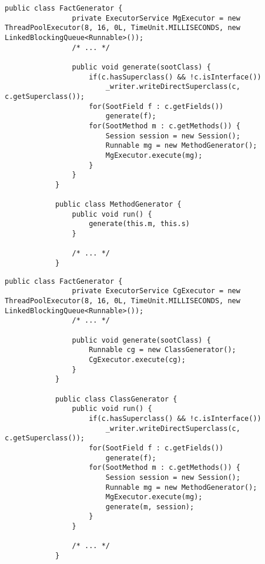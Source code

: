 \documentclass{dithesis}
\begin{document}
        \begin{lstlisting}[frame=single]
            public class FactGenerator {
                private ExecutorService MgExecutor = new ThreadPoolExecutor(8, 16, 0L, TimeUnit.MILLISECONDS, new LinkedBlockingQueue<Runnable>());
                /* ... */

                public void generate(sootClass) {
                    if(c.hasSuperclass() && !c.isInterface())
                        _writer.writeDirectSuperclass(c, c.getSuperclass());
                    for(SootField f : c.getFields())
                        generate(f);
                    for(SootMethod m : c.getMethods()) {
                        Session session = new Session();
                        Runnable mg = new MethodGenerator();
                        MgExecutor.execute(mg);
                    }
                }
            }

            public class MethodGenerator {
                public void run() {
                    generate(this.m, this.s)
                }

                /* ... */
            }
        \end{lstlisting}

        \begin{lstlisting}[frame=single]
            public class FactGenerator {
                private ExecutorService CgExecutor = new ThreadPoolExecutor(8, 16, 0L, TimeUnit.MILLISECONDS, new LinkedBlockingQueue<Runnable>());
                /* ... */

                public void generate(sootClass) {
                    Runnable cg = new ClassGenerator();
                    CgExecutor.execute(cg);
                }
            }

            public class ClassGenerator {
                public void run() {
                    if(c.hasSuperclass() && !c.isInterface())
                        _writer.writeDirectSuperclass(c, c.getSuperclass());
                    for(SootField f : c.getFields())
                        generate(f);
                    for(SootMethod m : c.getMethods()) {
                        Session session = new Session();
                        Runnable mg = new MethodGenerator();
                        MgExecutor.execute(mg);
                        generate(m, session);
                    }
                }

                /* ... */
            }
        \end{lstlisting}
\end{document}
